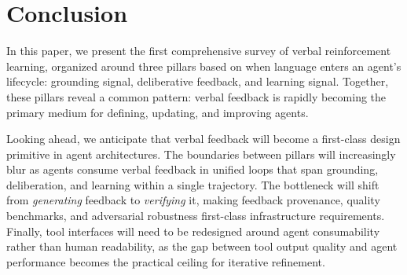 \section{Conclusion}
\label{sec:conclusion}
In this paper, we present the first comprehensive survey of verbal reinforcement learning, organized around three pillars based on when language enters an agent's lifecycle: grounding signal, deliberative feedback, and learning signal. Together, these pillars reveal a common pattern: verbal feedback is rapidly becoming the primary medium for defining, updating, and improving agents.

Looking ahead, we anticipate that verbal feedback will become a first-class
design primitive in agent architectures. The boundaries between pillars will
increasingly blur as agents consume verbal feedback in unified loops that span
grounding, deliberation, and learning within a single trajectory. The bottleneck
will shift from \textit{generating} feedback to \textit{verifying} it, making
feedback provenance, quality benchmarks, and adversarial robustness first-class
infrastructure requirements. Finally, tool interfaces will need to be redesigned
around agent consumability rather than human readability, as the gap between
tool output quality and agent performance becomes the practical ceiling for
iterative refinement.




